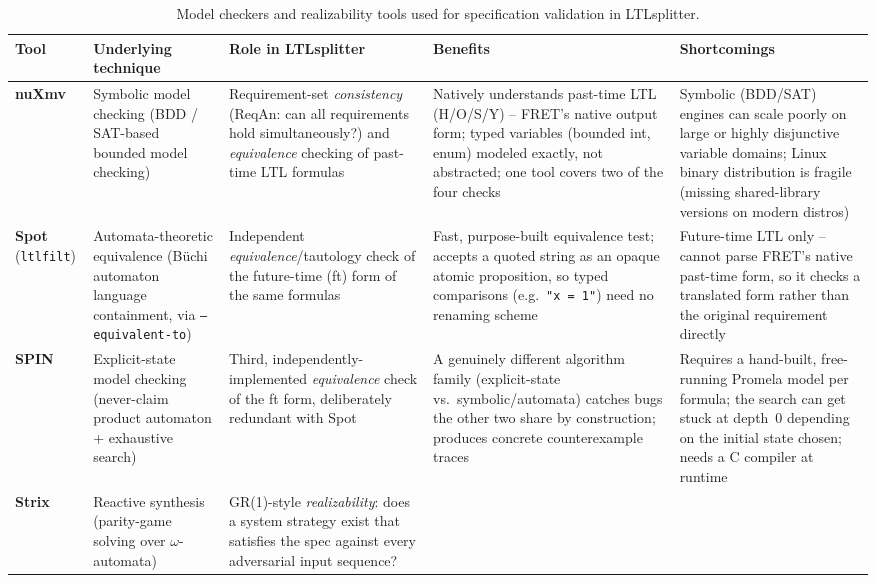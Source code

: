 \documentclass[11pt]{article}
\begin{document}
\begin{table}[htbp]
\centering
\footnotesize
\begin{threeparttable}
\caption{Model checkers and realizability tools used for specification validation in LTLsplitter.}
\label{tab:validation-tools}
\begin{tabularx}{\textwidth}{@{} l l >{\raggedright\arraybackslash}X >{\raggedright\arraybackslash}X >{\raggedright\arraybackslash}X @{}}
\toprule
\textbf{Tool} & \textbf{Underlying technique} & \textbf{Role in LTLsplitter} & \textbf{Benefits} & \textbf{Shortcomings} \\
\midrule
\textbf{nuXmv}
  & Symbolic model checking (BDD / SAT-based bounded model checking)
  & Requirement-set \emph{consistency} (ReqAn: can all requirements hold simultaneously?) and \emph{equivalence} checking of past-time LTL formulas
  & Natively understands past-time LTL (H/O/S/Y) -- FRET's native output form; typed variables (bounded int, enum) modeled exactly, not abstracted; one tool covers two of the four checks
  & Symbolic (BDD/SAT) engines can scale poorly on large or highly disjunctive variable domains; Linux binary distribution is fragile (missing shared-library versions on modern distros) \\
\textbf{Spot} (\texttt{ltlfilt})
  & Automata-theoretic equivalence (Büchi automaton language containment, via \texttt{--equivalent-to})
  & Independent \emph{equivalence}/tautology check of the future-time (ft) form of the same formulas
  & Fast, purpose-built equivalence test; accepts a quoted string as an opaque atomic proposition, so typed comparisons (e.g.\ \texttt{"x = 1"}) need no renaming scheme
  & Future-time LTL only -- cannot parse FRET's native past-time form, so it checks a translated form rather than the original requirement directly \\
\textbf{SPIN}
  & Explicit-state model checking (never-claim product automaton + exhaustive search)
  & Third, independently-implemented \emph{equivalence} check of the ft form, deliberately redundant with Spot
  & A genuinely different algorithm family (explicit-state vs.\ symbolic/automata) catches bugs the other two share by construction; produces concrete counterexample traces
  & Requires a hand-built, free-running Promela model per formula; the search can get stuck at depth~0 depending on the initial state chosen; needs a C compiler at runtime \\
\textbf{Strix}
  & Reactive synthesis (parity-game solving over $\omega$-automata)
  & GR(1)-style \emph{realizability}: does a system strategy exist that satisfies the spec against every adversarial input sequence?

\end{tabularx}
\end{threeparttable}
\end{table}
\end{document}
